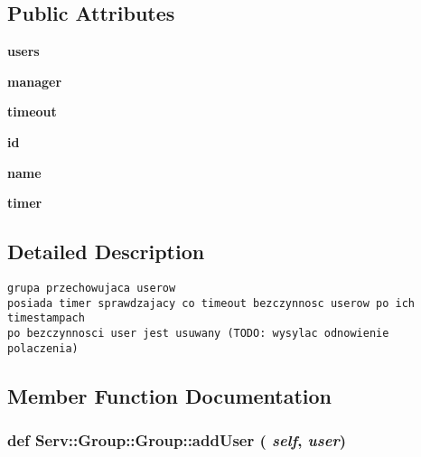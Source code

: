 \subsection*{Public Attributes}
\begin{CompactItemize}
\item 
\hypertarget{class_serv_1_1_group_1_1_group_8da1d96bcde84573f936683336b10064}{
\textbf{users}}
\label{class_serv_1_1_group_1_1_group_8da1d96bcde84573f936683336b10064}

\item 
\hypertarget{class_serv_1_1_group_1_1_group_d89e6d491f6237fb219f1affca48684b}{
\textbf{manager}}
\label{class_serv_1_1_group_1_1_group_d89e6d491f6237fb219f1affca48684b}

\item 
\hypertarget{class_serv_1_1_group_1_1_group_87949bedd26e03b7117116b517d239de}{
\textbf{timeout}}
\label{class_serv_1_1_group_1_1_group_87949bedd26e03b7117116b517d239de}

\item 
\hypertarget{class_serv_1_1_group_1_1_group_bfb82fc7970fba46ba77edf1fae41dea}{
\textbf{id}}
\label{class_serv_1_1_group_1_1_group_bfb82fc7970fba46ba77edf1fae41dea}

\item 
\hypertarget{class_serv_1_1_group_1_1_group_0b9cb49f5d6e2b732f8b4b4ea685999d}{
\textbf{name}}
\label{class_serv_1_1_group_1_1_group_0b9cb49f5d6e2b732f8b4b4ea685999d}

\item 
\hypertarget{class_serv_1_1_group_1_1_group_f32cede000e34bd216170b4969c2e938}{
\textbf{timer}}
\label{class_serv_1_1_group_1_1_group_f32cede000e34bd216170b4969c2e938}

\end{CompactItemize}


\subsection{Detailed Description}


\footnotesize\begin{verbatim}grupa przechowujaca userow
posiada timer sprawdzajacy co timeout bezczynnosc userow po ich timestampach
po bezczynnosci user jest usuwany (TODO: wysylac odnowienie polaczenia)

\end{verbatim}
\normalsize
 

\subsection{Member Function Documentation}
\hypertarget{class_serv_1_1_group_1_1_group_0a4183d2362794bd55741a35e4b5a91d}{
\subsubsection[{addUser}]{\setlength{\rightskip}{0pt plus 5cm}def Serv::Group::Group::addUser ( {\em self}, \/   {\em user})}}
\label{class_serv_1_1_group_1_1_group_0a4183d2362794bd55741a35e4b5a91d}





